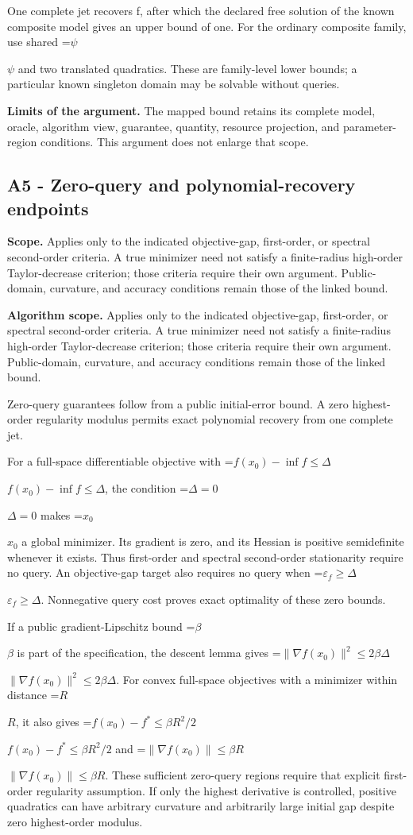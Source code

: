 \documentclass[10pt,a4paper]{article}
\newcommand{\AtlasMath}[1]{\par\begingroup\centering\setbox0=\hbox{$\displaystyle #1$}\ifdim\wd0>1.4\linewidth\typeout{ATLAS WIDE FORMULA: \the\wd0}\fi\ifdim\wd0>\linewidth\resizebox{\linewidth}{!}{\box0}\else\box0\fi\par\endgroup}
\newcommand{\AtlasInlineMath}[1]{\begingroup\setbox0=\hbox{$#1$}\ifdim\wd0>.4\linewidth\endgroup\AtlasMath{#1}\else\endgroup$#1$\fi}
\begin{document}
One complete jet recovers f, after which the declared free solution of the known composite model gives an upper bound of one. For the ordinary composite family, use shared \AtlasInlineMath{\psi}=0 and two translated quadratics. These are family-level lower bounds; a particular known singleton domain may be solvable without queries.

\textbf{Limits of the argument.} The mapped bound retains its complete model, oracle, algorithm view, guarantee, quantity, resource projection, and parameter-region conditions. This argument does not enlarge that scope.

\subsection{A5 - Zero-query and polynomial-recovery endpoints}
\textbf{Scope.} Applies only to the indicated objective-gap, first-order, or spectral second-order criteria. A true minimizer need not satisfy a finite-radius high-order Taylor-decrease criterion; those criteria require their own argument. Public-domain, curvature, and accuracy conditions remain those of the linked bound.

\textbf{Algorithm scope.} Applies only to the indicated objective-gap, first-order, or spectral second-order criteria. A true minimizer need not satisfy a finite-radius high-order Taylor-decrease criterion; those criteria require their own argument. Public-domain, curvature, and accuracy conditions remain those of the linked bound.

Zero-query guarantees follow from a public initial-error bound. A zero highest-order regularity modulus permits exact polynomial recovery from one complete jet.

For a full-space differentiable objective with \AtlasInlineMath{f(x_0)-\inf f\le\Delta}, the condition \AtlasInlineMath{\Delta=0} makes \AtlasInlineMath{x_0} a global minimizer. Its gradient is zero, and its Hessian is positive semidefinite whenever it exists. Thus first-order and spectral second-order stationarity require no query. An objective-gap target also requires no query when \AtlasInlineMath{\varepsilon_f\ge\Delta}. Nonnegative query cost proves exact optimality of these zero bounds.

If a public gradient-Lipschitz bound \AtlasInlineMath{\beta} is part of the specification, the descent lemma gives \AtlasInlineMath{\|\nabla f(x_0)\|^2\le2\beta\Delta}. For convex full-space objectives with a minimizer within distance \AtlasInlineMath{R}, it also gives \AtlasInlineMath{f(x_0)-f^*\le\beta R^2/2} and \AtlasInlineMath{\|\nabla f(x_0)\|\le\beta R}. These sufficient zero-query regions require that explicit first-order regularity assumption. If only the highest derivative is controlled, positive quadratics can have arbitrary curvature and arbitrarily large initial gap despite zero highest-order modulus.
\end{document}
